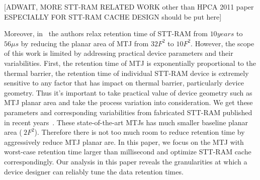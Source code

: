 [ADWAIT, MORE STT-RAM RELATED WORK other than HPCA 2011 paper ESPECIALLY FOR STT-RAM CACHE DESIGN should be put here]

Moreover, in~\cite{STTRAM:HPCA11} the authors relax retention time of STT-RAM from $10 years$ to $56 \mu s$ by reducing the planar area of MTJ from $32F^2$ to $10F^2$. However, the scope of this work is limited by addressing practical device parameters and their variabilities. First, the retention time of MTJ is exponentially proportional to the thermal barrier, the retention time of individual STT-RAM device is extremely sensitive to any factor that has impact on thermal barrier, particularly device geometry. Thus it's important to take practical value of device geometry such as MTJ planar area and take the process variation into consideration. We get these parameters and corresponding variabilities from fabricated STT-RAM published in recent years~\cite{PMTJ:Toshiba08;STTRAM:EDL11;STTRAM:Qualcomm09;STTRAM:Grandis11}. These state-of-the-art MTJs has much smaller baseline planar area ($~2F^2$). Therefore there is not too much room to reduce retention time by aggressively reduce MTJ planar are. In this paper, we focus on the MTJ with worst-case retention time larger than millisecond and optimize STT-RAM cache correspondingly. Our analysis in this paper reveals the granularities at which a device designer can reliably tune the data retention times. 
